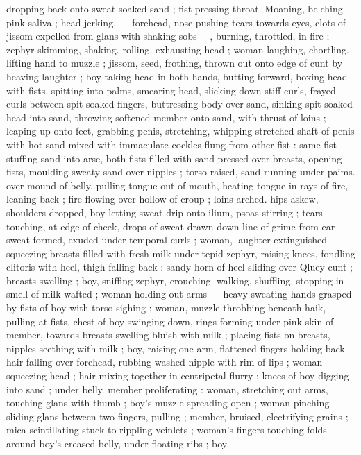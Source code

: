 dropping back onto sweat-soaked sand ; fist pressing throat.
Moaning, belching pink saliva ; head jerking, --- forehead, nose
pushing tears towards eyes, clots of jissom expelled from glans with
shaking sobs ---, burning, throttled, in fire ; zephyr skimming,
shaking. rolling, exhausting head ; woman laughing, chortling. lifting
hand to muzzle ; jissom, seed, frothing, thrown out onto edge of cunt
by heaving laughter ; boy taking head in both hands, butting forward,
boxing head with fists, spitting into palms, smearing head, slicking
down stiff curls, frayed curls between spit-soaked fingers,
buttressing body over sand, sinking spit-soaked head into sand,
throwing softened member onto sand, with thrust of loins ; leaping
up onto feet, grabbing penis, stretching, whipping stretched shaft of
penis with hot sand mixed with immaculate cockles flung from other
fist : same fist stuffing sand into arse, both fists filled with sand
pressed over breasts, opening fists, moulding sweaty sand over
nipples ; torso raised, sand running under paims. over mound of
belly, pulling tongue out of mouth, heating tongue in rays of fire,
leaning back ; fire flowing over hollow of croup ; loins arched. hips
askew, shoulders dropped, boy letting sweat drip onto ilium, psoas
stirring ; tears touching, at edge of cheek, drops of sweat drawn
down line of grime from ear --- sweat formed, exuded under
temporal curls ; woman, laughter extinguished squeezing breasts
filled with fresh milk under tepid zephyr, raising knees, fondling
clitoris with heel, thigh falling back : sandy horn of heel sliding over
Qluey cunt ; breasts swelling ; boy, sniffing zephyr, crouching.
walking, shuffling, stopping in smell of milk wafted ; woman holding
out arms --- heavy sweating hands grasped by fists of boy with torso
sighing : woman, muzzle throbbing beneath haik, pulling at fists,
chest of boy swinging down, rings forming under pink skin of
member, towards breasts swelling bluish with milk ; placing fists on
breasts, nipples seething with milk ; boy, raising one arm, flattened
fingers holding back hair falling over forehead, rubbing washed
nipple with rim of lips ; woman squeezing head ; hair mixing together
in centripetal flurry ; knees of boy digging into sand ; under belly.
member proliferating : woman, stretching out arms, touching glans
with thumb ; boy's muzzle spreading open ; woman pinching sliding
glans between two fingers, pulling ; member, bruised, electrifying
grains ; mica scintillating stuck to rippling veinlets ; woman's fingers
touching folds around boy's creased belly, under floating ribs ; boy
